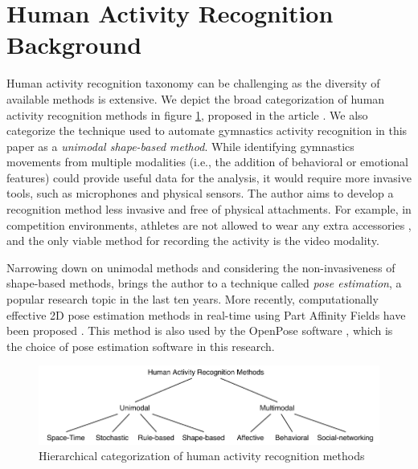 \section{Human Activity Recognition\\ Background}

Human activity recognition taxonomy can be challenging as the diversity of available methods is extensive. We depict the broad categorization of human activity recognition methods in figure \ref{har-taxonomy}, proposed in the article \cite{10.3389/frobt.2015.00028}. We also categorize the technique used to automate gymnastics activity recognition in this paper as a \textit{unimodal shape-based method}. While identifying gymnastics movements from multiple modalities (i.e., the addition of behavioral or emotional features) could provide useful data for the analysis, it would require more invasive tools, such as microphones and physical sensors. The author aims to develop a recognition method less invasive and free of physical attachments. For example, in competition environments, athletes are not allowed to wear any extra accessories \cite{acrobatic-gymnastics-rules-and-policies}, and the only viable method for recording the activity is the video modality. 

Narrowing down on unimodal methods and considering the non-invasiveness of shape-based methods, brings the author to a technique called \textit{pose estimation}, a popular research topic in the last ten years. More recently, computationally effective 2D pose estimation methods in real-time using Part Affinity Fields have been proposed \cite{DBLP:journals/corr/CaoSWS16}. This method is also used by the OpenPose software \cite{DBLP:journals/corr/abs-1812-08008}, which is the choice of pose estimation software in this research. 

\begin{figure}[htb]
  \centering
    \includegraphics[width=\textwidth,keepaspectratio]
    {images/introduction/har-taxonomy.pdf}
    \caption{Hierarchical categorization of human activity recognition methods}
    \label{har-taxonomy}
\end{figure}




